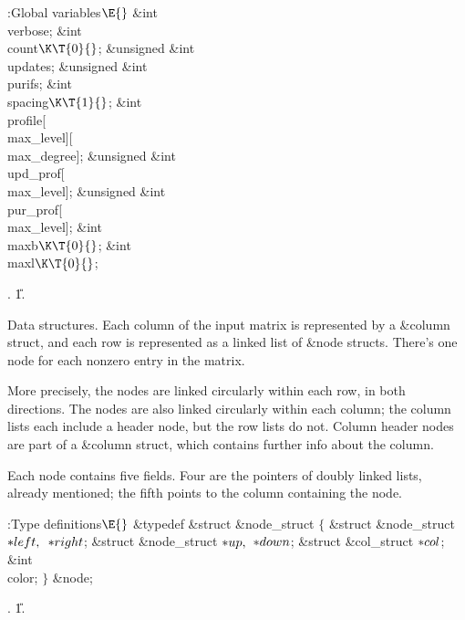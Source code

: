 \B{}:Global variables\X${}\E{}$\6
\&{int} \\{verbose};%
\6
\&{int} \\{count}${}\K\T{0}{}$;\6
\&{unsigned} \&{int} \\{updates};\6
\&{unsigned} \&{int} \\{purifs};\6
\&{int} \\{spacing}${}\K\T{1}{}$;\6
\&{int} \\{profile}[\\{max\_level}][\\{max\_degree}];\6
\&{unsigned} \&{int} \\{upd\_prof}[\\{max\_level}];\6
\&{unsigned} \&{int} \\{pur\_prof}[\\{max\_level}];\6
\&{int} \\{maxb}${}\K\T{0}{}$;\6
\&{int} \\{maxl}${}\K\T{0}{}$;\par
{}.
\U1.\fi

Data structures.
Each column of the input matrix is represented by a \&{column} struct,
and each row is represented as a linked list of \&{node} structs. There's one
node for each nonzero entry in the matrix.

More precisely, the nodes are linked circularly within each row, in
both directions. The nodes are also linked circularly within each column;
the column lists each include a header node, but the row lists do not.
Column header nodes are part of a \&{column} struct, which
contains further info about the column.

Each node contains five fields. Four are the pointers of doubly linked lists,
already mentioned; the fifth points to the column containing the node.

\Y\B\4:Type definitions\X${}\E{}$\6
\&{typedef} \&{struct} \&{node\_struct} ${}\{{}$\1\6
\&{struct} \&{node\_struct} ${}{*}\\{left},{}$ ${}{*}\\{right}{}$;\6
\&{struct} \&{node\_struct} ${}{*}\\{up},{}$ ${}{*}\\{down}{}$;\6
\&{struct} \&{col\_struct} ${}{*}\\{col}{}$;\6
\&{int} \\{color};\2\6
${}\}{}$ \&{node};\par
{}.
\U1.\fi

